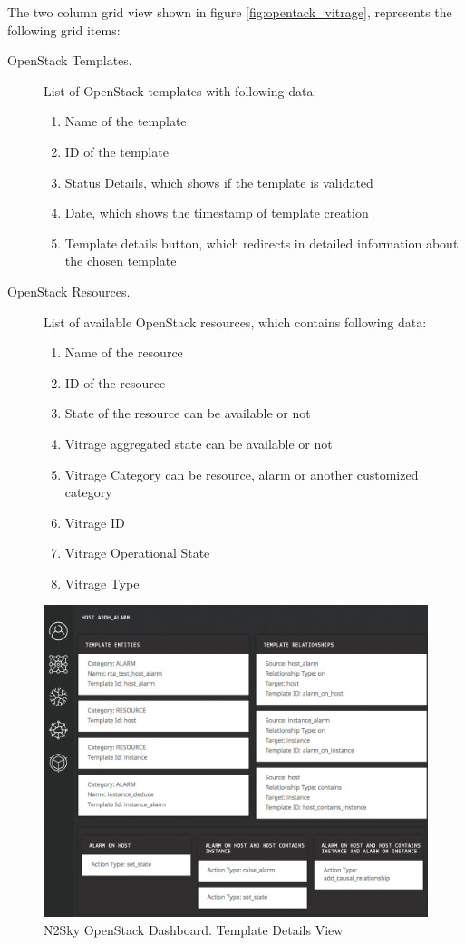 The two column grid view shown in figure \ref{fig:opentack_vitrage}, represents the following grid items:

\begin{description}
\item[OpenStack Templates.]  List of OpenStack templates with following data:
\begin{enumerate}
\item Name of the template
\item ID of the template
\item Status Details, which shows if the template is validated 
\item Date, which shows the timestamp of template creation 
\item Template details button, which redirects in detailed information about the chosen template
\end{enumerate}

\item[OpenStack Resources.] List of available OpenStack resources, which contains following data:
\begin{enumerate}
\item Name of the resource
\item ID of the resource
\item State of the resource can be available or not
\item Vitrage aggregated state can be available or not
\item Vitrage Category can be resource, alarm or another customized category
\item Vitrage ID
\item Vitrage Operational State
\item Vitrage Type
\end{enumerate}
\end{description}

\begin{figure}[htbp]
\begin{center}
  \includegraphics[width=\linewidth]{components/4/pics/openstack_template.png}
  \caption{N2Sky OpenStack Dashboard. Template Details View}
  \label{fig:openstack_template}
\end{center}
\end{figure}

